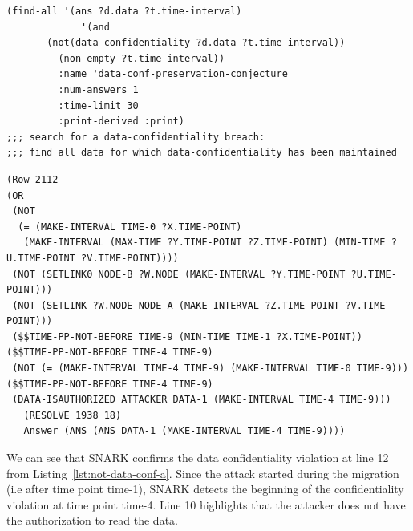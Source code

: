 \begin{lstlisting}[caption=SNARK question to detect the data confidentiality violation., label=lst:not-data-conf-q,captionpos=b] 
   (find-all '(ans ?d.data ?t.time-interval)
             '(and
       (not(data-confidentiality ?d.data ?t.time-interval))
         (non-empty ?t.time-interval))
         :name 'data-conf-preservation-conjecture
         :num-answers 1
         :time-limit 30
         :print-derived :print)
;;; search for a data-confidentiality breach:
;;; find all data for which data-confidentiality has been maintained

\end{lstlisting}
\begin{lstlisting}[caption=SNARK detecting the data confidentiality violation., label=lst:not-data-conf-a,captionpos=b] 
(Row 2112  
(OR
 (NOT
  (= (MAKE-INTERVAL TIME-0 ?X.TIME-POINT)
   (MAKE-INTERVAL (MAX-TIME ?Y.TIME-POINT ?Z.TIME-POINT) (MIN-TIME ?U.TIME-POINT ?V.TIME-POINT))))
 (NOT (SETLINK0 NODE-B ?W.NODE (MAKE-INTERVAL ?Y.TIME-POINT ?U.TIME-POINT)))
 (NOT (SETLINK ?W.NODE NODE-A (MAKE-INTERVAL ?Z.TIME-POINT ?V.TIME-POINT)))
 ($$TIME-PP-NOT-BEFORE TIME-9 (MIN-TIME TIME-1 ?X.TIME-POINT)) ($$TIME-PP-NOT-BEFORE TIME-4 TIME-9)
 (NOT (= (MAKE-INTERVAL TIME-4 TIME-9) (MAKE-INTERVAL TIME-0 TIME-9))) ($$TIME-PP-NOT-BEFORE TIME-4 TIME-9)
 (DATA-ISAUTHORIZED ATTACKER DATA-1 (MAKE-INTERVAL TIME-4 TIME-9)))
   (RESOLVE 1938 18)
   Answer (ANS (ANS DATA-1 (MAKE-INTERVAL TIME-4 TIME-9)))) 
\end{lstlisting}
We can see that SNARK confirms the data confidentiality violation at line 12 from Listing~\ref{lst:not-data-conf-a}.
Since the attack started during the migration (i.e after time point time-1), SNARK detects the beginning of the confidentiality violation at time point time-4.
Line 10 highlights that the attacker does not have the authorization to read the data.

